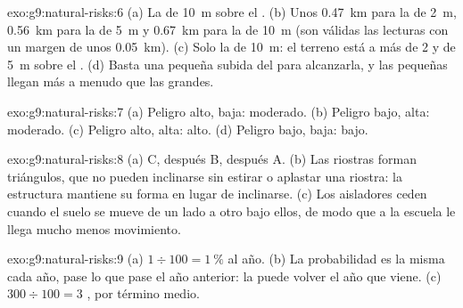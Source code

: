 \begin{solution}{exo:g9:natural-risks:6}
(a) La  de \qty{10}{m} sobre el . (b) Unos \qty{0.47}{km} para
la  de \qty{2}{m}, \qty{0.56}{km} para la de \qty{5}{m} y
\qty{0.67}{km} para la de \qty{10}{m} (son válidas las lecturas con un
margen de unos \qty{0.05}{km}). (c) Solo la  de \qty{10}{m}: el
terreno está a más de 2 y de \qty{5}{m} sobre el . (d) Basta una
pequeña subida del  para alcanzarla, y las  pequeñas llegan
más a menudo que las grandes.
\end{solution}

\begin{solution}{exo:g9:natural-risks:7}
(a) Peligro alto,  baja:  moderado. (b) Peligro bajo,
 alta:  moderado. (c) Peligro alto, 
alta:  alto. (d) Peligro bajo,  baja:  bajo.
\end{solution}

\begin{solution}{exo:g9:natural-risks:8}
(a) C, después B, después A. (b) Las riostras forman triángulos, que no
pueden inclinarse sin estirar o aplastar una riostra: la estructura
mantiene su forma en lugar de inclinarse. (c) Los aisladores ceden cuando
el suelo se mueve de un lado a otro bajo ellos, de modo que a la escuela le
llega mucho menos movimiento.
\end{solution}

\begin{solution}{exo:g9:natural-risks:9}
(a) $1 \div 100 = 1~\%$ al año. (b) La probabilidad es la misma cada año,
pase lo que pase el año anterior: la  puede volver el año que
viene. (c) $300 \div 100 = 3$ , por término medio.
\end{solution}

